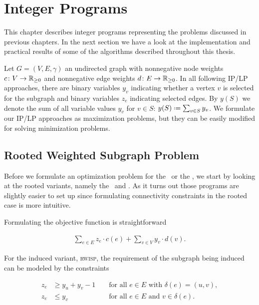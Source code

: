 \section{Integer Programs}
\label{sec:integer}

This chapter describes integer programs representing the problems discussed in previous chapters. In the next section we have a look at the implementation and practical results of some of the algorithms described throughout this thesis.\medskip

Let $G=(V,E,\gamma)$ an undirected graph with nonnegative node weights $c\colon V \to \mathbb{R}_{\geq 0}$ and nonnegative edge weights $d\colon E \to \mathbb{R}_{\geq 0}$. In all following IP/LP approaches, there are binary variables $y_v$ indicating whether a vertex $v$ is selected for the subgraph and binary variables $z_{e}$ indicating selected edges. By $y(S)$ we denote the sum of all variable values $y_v$ for $v \in S$: $y(S) \defeq \sum_{v \in S} y_v$. We formulate our IP/LP approaches as maximization problems, but they can be easily modified for solving minimization problems.

\subsection{Rooted Weighted Subgraph Problem}
\label{sec:integer:rooted}

Before we formulate an optimization problem for the \WSP\ or the \WISP, we start by looking at the rooted variants, namely the \RWSP\ and \RWISP. As it turns out those programs are slightly easier to set up since formulating connectivity constraints in the rooted case is more intuitive.\medskip

Formulating the objective function is straightforward

\begin{equation}
	\label{equation:objfunction}
	\begin{aligned}
		\sum_{e \in E} z_e \cdot c(e) + \sum_{v \in V} y_v \cdot d(v).
	\end{aligned}
\end{equation}

For the induced variant, \textsc{rwisp}, the requirement of the subgraph being induced can be modeled by the constraints

\begin{equation}
	\label{equation:induceconstraint}
	\begin{aligned}
		z_e &\geq y_u + y_v - 1 &&\text{ for all } e \in E \text{ with } \delta(e) = (u, v),\\
		z_e &\leq y_v &&\text{ for all } e \in E \text{ and } v \in \delta(e).
	\end{aligned}
\end{equation}

